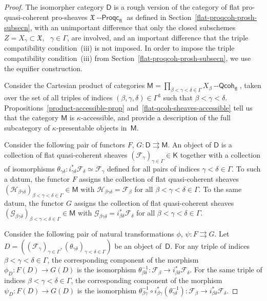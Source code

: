 \documentclass[12pt,a4paper]{amsart}
\newcommand{\+}{\protect\nobreakdash-}
\renewcommand{\:}{\colon}
\newcommand{\rarrow}{\longrightarrow}
\newcommand{\Qcoh}{{\operatorname{\mathsf{--Qcoh}}}}
\newcommand{\Proqc}{{\operatorname{\mathsf{--Proqc}}}}
\newcommand{\fl}{\mathsf{fl}}
\newcommand{\sD}{\mathsf D}
\newcommand{\sK}{\mathsf K}
\newcommand{\sM}{\mathsf M}
\newcommand{\cF}{\mathcal F}
\newcommand{\cG}{\mathcal G}
\newcommand{\cH}{\mathcal H}
\newcommand{\fX}{\mathfrak X}
\theoremstyle{plain}
\theoremstyle{definition}
\begin{document}
\begin{proof}
 The isomorpher category $\sD$ is a rough version of the category of
flat pro-quasi-coherent pro-sheaves $\fX\Proqc_\fl$ as defined in
Section~\ref{flat-proqcoh-prosh-subsecn}, with an unimportant
difference that only the closed subschemes $Z=X_\gamma\subset\fX$,
\ $\gamma\in\Gamma$, are involved, and an important difference that
the triple compatibility condition~(iii) is not imposed.
 In order to impose the triple compatibility condition~(iii) from
Section~\ref{flat-proqcoh-prosh-subsecn}, we use the equifier
construction.

 Consider the Cartesian product of categories
$\sM=\prod_{\beta<\gamma<\delta\in\Gamma}X_\beta\Qcoh_\fl$, taken over
the set of all triples of indices $(\beta,\gamma,\delta)\in\Gamma^3$
such that $\beta<\gamma<\delta$.
 Propositions~\ref{product-accessible-prop}
and~\ref{flat-qcoh-sheaves-accessible} tell us that the category $\sM$
is $\kappa$\+accessible, and provide a description of the full
subcategory of $\kappa$\+presentable objects in~$\sM$.

 Consider the following pair of functors
$F$, $G\:\sD\rightrightarrows\sM$.
 An object of $\sD$ is a collection of flat quasi-coherent sheaves
$(\cF_\gamma)_{\gamma\in\Gamma}\in\sK$ together with a collection
of isomorphisms $\theta_{\gamma\delta}\:i_{\gamma\delta}^*\cF_\delta
\simeq\cF_\gamma$ defined for all pairs of indices
$\gamma<\delta\in\Gamma$.
 To such a datum, the functor $F$ assigns the collection of flat
quasi-coherent sheaves
$(\cH_{\beta\gamma\delta})_{\beta<\gamma<\delta\in\Gamma}\in\sM$
with $\cH_{\beta\gamma\delta}=\cF_\beta$ for all
$\beta<\gamma<\delta\in\Gamma$.
 To the same datum, the functor $G$ assigns the collection of
flat quasi-coherent sheaves
$(\cG_{\beta\gamma\delta})_{\beta<\gamma<\delta\in\Gamma}\in\sM$
with $\cG_{\beta\gamma\delta}=i_{\beta\delta}^*\cF_\delta$
for all $\beta<\gamma<\delta\in\Gamma$.

 Consider the following pair of natural transformations
$\phi$, $\psi\:F\rightrightarrows G$.
 Let $D=((\cF_\gamma)_{\gamma\in\Gamma},
(\theta_{\gamma\delta})_{\gamma<\delta\in\Gamma})$ be
an object of~$\sD$.
 For any triple of indices $\beta<\gamma<\delta\in\Gamma$,
the corresponding component of the morphism $\phi_D\:F(D)\rarrow G(D)$
is the isomorphism $\theta_{\beta\delta}^{-1}\:\cF_\beta\rarrow
i^*_{\beta\delta}\cF_\delta$.
 For the same triple of indices $\beta<\gamma<\delta\in\Gamma$,
the corresponding component of the morphism $\psi_D\:F(D)\rarrow G(D)$
is the isomorphism $\theta_{\beta\gamma}^{-1}\circ
i^*_{\beta\gamma}(\theta_{\gamma\delta}^{-1})\:\cF_\beta\rarrow
i^*_{\beta\delta}\cF_\delta$.


\end{proof}
\end{document}
